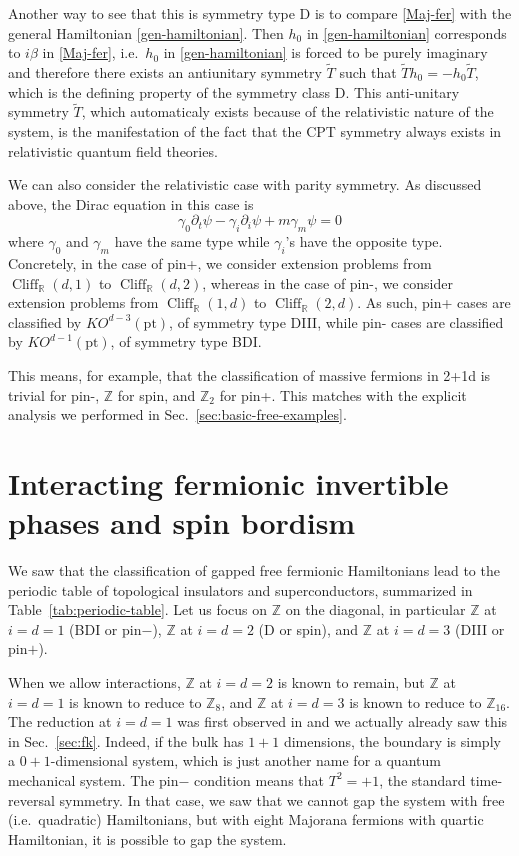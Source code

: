 \documentclass[12pt]{article}
\numberwithin{equation}{section}
\numberwithin{figure}{section}
\theoremstyle{remark}
\def\bR{\mathbb{R}}
\def\bZ{\mathbb{Z}}
\def\pt{\mathrm{pt}}
\def\Cliff{\mathop{\mathrm{Cliff}}\nolimits}
\begin{document}
Another way to see that this is symmetry type D is to compare \eqref{Maj-fer}
with the general Hamiltonian \eqref{gen-hamiltonian}.
Then $h_0$ in \eqref{gen-hamiltonian} corresponds to $i\beta$ in \eqref{Maj-fer}, 
i.e.~$h_0$ in \eqref{gen-hamiltonian} is forced to be purely imaginary and 
therefore there exists an antiunitary symmetry $\tilde T$ such that $\tilde Th_0=-h_0 \tilde T$,
which is the defining property of the symmetry class D.
This anti-unitary symmetry $\tilde T$, which automaticaly exists because of the
relativistic nature of the system,
is the manifestation of the fact that the CPT symmetry always exists in relativistic quantum field theories.

We can also consider the relativistic case with parity symmetry.
As discussed above, the Dirac equation in this case is \begin{equation}
\gamma_0\partial_t\psi -\gamma_i \partial_i\psi + m\gamma_m\psi =0
\end{equation}
where $\gamma_0$ and $\gamma_m$ have the same type while $\gamma_i$'s have the opposite type.
Concretely, in the case of pin+, we consider extension problems
from $\Cliff_\bR(d,1)$ to $\Cliff_\bR(d,2)$,
whereas in the case of pin-, we consider extension problems
from $\Cliff_\bR(1,d)$ to $\Cliff_\bR(2,d)$.
As such, pin+ cases are classified by $KO^{d-3}(\pt)$, of symmetry type DIII,
while pin- cases are classified by $KO^{d-1}(\pt)$, of symmetry type BDI.

This means, for example, that the  classification of massive fermions in 2+1d
is trivial for pin-, $\bZ$ for spin, and $\bZ_2$ for pin+.
This matches with the explicit analysis we performed in Sec.~\ref{sec:basic-free-examples}.
\goodbreak

\section{Interacting fermionic invertible phases and spin bordism}
We saw that the classification of gapped free fermionic Hamiltonians lead to 
the periodic table of topological insulators and superconductors,
summarized in Table~\ref{tab:periodic-table}.
Let us focus on $\bZ$ on the diagonal, in particular
$\bZ$ at $i=d=1$ (BDI or pin$-$),
$\bZ$ at $i=d=2$ (D or spin), and $\bZ$ at $i=d=3$ (DIII or pin$+$). 

When we allow interactions, $\bZ$ at $i=d=2$ is known to remain,
but $\bZ$ at $i=d=1$ is known to reduce to $\bZ_8$,
and $\bZ$ at $i=d=3$ is known to reduce to $\bZ_{16}$.
The reduction at $i=d=1$ was first observed in \cite{Fidkowski:2009dba} and we
actually already saw this in Sec.~\ref{sec:fk}.
Indeed, if the bulk has $1+1$ dimensions, the boundary is simply a $0+1$-dimensional system, which is just another name for a quantum mechanical system.
The pin$-$ condition means that $T^2=+1$, the standard time-reversal symmetry.
In that case, we saw that we cannot gap the system with free (i.e.~quadratic)
Hamiltonians, but with eight Majorana fermions with quartic Hamiltonian,
it is possible to gap the system.
\end{document}
